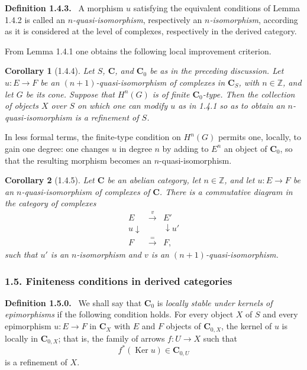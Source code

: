 \documentclass[11pt]{article}
\theoremstyle{plain}
\newtheorem*{corollary*}{Corollary}
\theoremstyle{definition}
\theoremstyle{remark}
\newenvironment{statement}[1]{\par\medskip\noindent\textbf{#1.}\ }{\par\medskip}
\newcommand{\ZZ}{\mathbb Z}
\DeclareMathOperator{\Ker}{Ker}
\begin{document}
\begin{statement}{Definition 1.4.3}
A morphism $u$ satisfying the equivalent conditions of Lemma 1.4.2 is called an \emph{$n$-quasi-isomorphism}, respectively an \emph{$n$-isomorphism}, according as it is considered at the level of complexes, respectively in the derived category.
\end{statement}

From Lemma 1.4.1 one obtains the following local improvement criterion.

\begin{corollary*}[1.4.4]
Let $S$, $\mathbf C$, and $\mathbf C_0$ be as in the preceding discussion. Let $u:E\to F$ be an $(n+1)$-quasi-isomorphism of complexes in $\mathbf C_S$, with $n\in\ZZ$, and let $G$ be its cone. Suppose that $H^n(G)$ is of finite $\mathbf C_0$-type. Then the collection of objects $X$ over $S$ on which one can modify $u$ as in 1.4.1 so as to obtain an $n$-quasi-isomorphism is a refinement of $S$.
\end{corollary*}

In less formal terms, the finite-type condition on $H^n(G)$ permits one, locally, to gain one degree: one changes $u$ in degree $n$ by adding to $E^n$ an object of $\mathbf C_0$, so that the resulting morphism becomes an $n$-quasi-isomorphism.

\begin{corollary*}[1.4.5]
Let $\mathbf C$ be an abelian category, let $n\in\ZZ$, and let $u:E\to F$ be an $n$-quasi-isomorphism of complexes of $\mathbf C$. There is a commutative diagram in the category of complexes
\[
\begin{array}{ccc}
E & \xrightarrow{v} & E'\\
u\downarrow & & \downarrow u'\\
F & \xrightarrow{=} & F,
\end{array}
\]
such that $u'$ is an $n$-isomorphism and $v$ is an $(n+1)$-quasi-isomorphism.
\end{corollary*}

\subsubsection*{1.5. Finiteness conditions in derived categories}

\begin{statement}{Definition 1.5.0}
We shall say that $\mathbf C_0$ is \emph{locally stable under kernels of epimorphisms} if the following condition holds. For every object $X$ of $S$ and every epimorphism $u:E\to F$ in $\mathbf C_X$ with $E$ and $F$ objects of $\mathbf C_{0,X}$, the kernel of $u$ is locally in $\mathbf C_{0,X}$; that is, the family of arrows $f:U\to X$ such that
\[
   f^*(\Ker u)\in\mathbf C_{0,U}
\]
is a refinement of $X$.
\end{statement}
\end{document}
